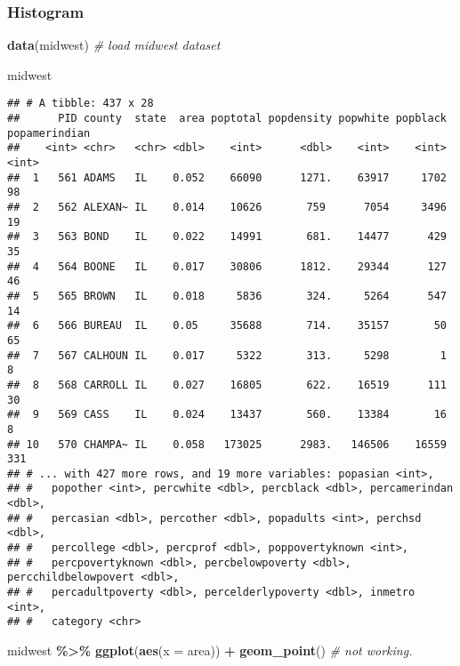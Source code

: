 \documentclass[
]{book}
\newenvironment{Shaded}{\begin{snugshade}}{\end{snugshade}}
\newcommand{\CommentTok}[1]{\textcolor[rgb]{0.56,0.35,0.01}{\textit{#1}}}
\newcommand{\DataTypeTok}[1]{\textcolor[rgb]{0.13,0.29,0.53}{#1}}
\newcommand{\KeywordTok}[1]{\textcolor[rgb]{0.13,0.29,0.53}{\textbf{#1}}}
\newcommand{\NormalTok}[1]{#1}
\newcommand{\OperatorTok}[1]{\textcolor[rgb]{0.81,0.36,0.00}{\textbf{#1}}}
\newcommand{\StringTok}[1]{\textcolor[rgb]{0.31,0.60,0.02}{#1}}
\begin{document}
\hypertarget{histogram}{%
\subsubsection{Histogram}\label{histogram}}

\begin{Shaded}
\begin{Highlighting}[]
\KeywordTok{data}\NormalTok{(midwest) }\CommentTok{\# load midwest dataset}

\NormalTok{midwest}
\end{Highlighting}
\end{Shaded}

\begin{verbatim}
## # A tibble: 437 x 28
##      PID county  state  area poptotal popdensity popwhite popblack popamerindian
##    <int> <chr>   <chr> <dbl>    <int>      <dbl>    <int>    <int>         <int>
##  1   561 ADAMS   IL    0.052    66090      1271.    63917     1702            98
##  2   562 ALEXAN~ IL    0.014    10626       759      7054     3496            19
##  3   563 BOND    IL    0.022    14991       681.    14477      429            35
##  4   564 BOONE   IL    0.017    30806      1812.    29344      127            46
##  5   565 BROWN   IL    0.018     5836       324.     5264      547            14
##  6   566 BUREAU  IL    0.05     35688       714.    35157       50            65
##  7   567 CALHOUN IL    0.017     5322       313.     5298        1             8
##  8   568 CARROLL IL    0.027    16805       622.    16519      111            30
##  9   569 CASS    IL    0.024    13437       560.    13384       16             8
## 10   570 CHAMPA~ IL    0.058   173025      2983.   146506    16559           331
## # ... with 427 more rows, and 19 more variables: popasian <int>,
## #   popother <int>, percwhite <dbl>, percblack <dbl>, percamerindan <dbl>,
## #   percasian <dbl>, percother <dbl>, popadults <int>, perchsd <dbl>,
## #   percollege <dbl>, percprof <dbl>, poppovertyknown <int>,
## #   percpovertyknown <dbl>, percbelowpoverty <dbl>, percchildbelowpovert <dbl>,
## #   percadultpoverty <dbl>, percelderlypoverty <dbl>, inmetro <int>,
## #   category <chr>
\end{verbatim}

\begin{Shaded}
\begin{Highlighting}[]
\NormalTok{midwest }\OperatorTok{\%\textgreater{}\%}
\StringTok{  }\KeywordTok{ggplot}\NormalTok{(}\KeywordTok{aes}\NormalTok{(}\DataTypeTok{x =}\NormalTok{ area)) }\OperatorTok{+}
\StringTok{  }\KeywordTok{geom\_point}\NormalTok{() }\CommentTok{\# not working.}
\end{Highlighting}
\end{Shaded}
\end{document}
